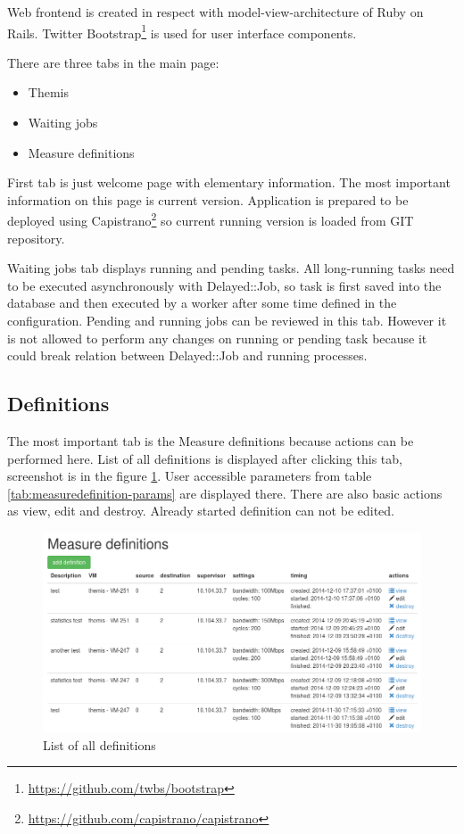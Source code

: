 Web frontend is created in respect with model-view-architecture of Ruby on Rails. Twitter Bootstrap\footnote{\url{https://github.com/twbs/bootstrap}} is used for user interface components.

There are three tabs in the main page:
	\begin{itemize}
		\item Themis
		\item Waiting jobs
		\item Measure definitions
	\end{itemize}

First tab is just welcome page with elementary information. The most important information on this page is current version. Application is prepared to be deployed using Capistrano\footnote{\url{https://github.com/capistrano/capistrano}} so current running version is loaded from GIT repository.

Waiting jobs tab displays running and pending tasks. All long-running tasks need to be executed asynchronously with Delayed::Job, so task is first saved into the database and then executed by a worker after some time defined in the configuration. Pending and running jobs can be reviewed in this tab. However it is not allowed to perform any changes on running or pending task because it could break relation between Delayed::Job and running processes.

\subsection{Definitions}
The most important tab is the Measure definitions because actions can be performed here. List of all definitions is displayed after clicking this tab, screenshot is in the figure \ref{img:themis-definitions}. User accessible parameters from table \ref{tab:measuredefinition-params} are displayed there. There are also basic actions as view, edit and destroy. Already started definition can not be edited.

\begin{figure}[htb]
	\begin{center}
	\includegraphics[width=\textwidth]{themis-definitions.png}
	\end{center}
	\caption{List of all definitions}
	\label{img:themis-definitions}
\end{figure}

